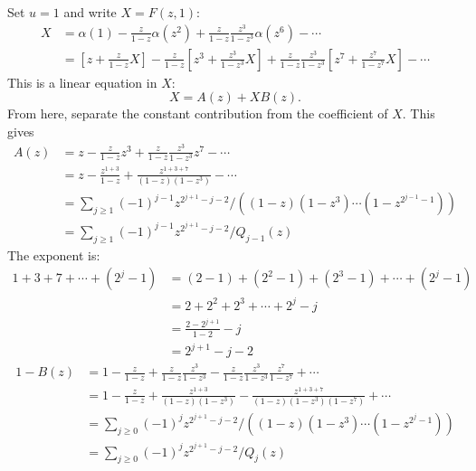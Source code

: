 Set $u = 1$ and write $X = F(z, 1)$:
\begin{equation*}
    \begin{aligned}
        X
        &= \alpha(1) - \frac{z}{1 - z} \alpha(z^{2}) + \frac{z}{1 - z} \frac{z^{3}}{1 - z^{3}}\alpha(z^{6}) - \cdots \\
        &= \left[z + \frac{z}{1 - z} X\right]
            - \frac{z}{1 - z} \left[z^{3} + \frac{z^{3}}{1 - z^{3}}X\right]
            + \frac{z}{1 - z} \frac{z^{3}}{1 - z^{3}}\left[z^{7} + \frac{z^{7}}{1 - z^{7}}X\right] - \cdots
    \end{aligned}
\end{equation*}
This is a linear equation in $X$:
\begin{equation} \label{eq:III.22.6}
    X = A(z) + X B(z).
\end{equation}
From here, separate the constant contribution from the coefficient of $X$. This gives
\begin{equation*}
    \begin{aligned}
        A(z)
        &= z - \frac{z}{1 - z} z^{3} + \frac{z}{1 - z} \frac{z^{3}}{1 - z^{3}}z^{7} - \cdots \\
        &= z - \frac{z^{1 + 3}}{1 - z} + \frac{z^{1 + 3 + 7}}{(1 - z)(1 - z^{3})} - \cdots \\
        &= \sum_{j \geq 1}(-1)^{j - 1}z^{2^{j + 1} - j - 2}/\left((1 - z)(1 - z^{3}) \cdots (1 - z^{2^{j - 1} - 1})\right) \\
        &= \sum_{j \geq 1}(-1)^{j - 1}z^{2^{j + 1} - j - 2}/Q_{j - 1}(z)
    \end{aligned}
\end{equation*}
The exponent is:
\begin{equation*}
    \begin{aligned}
        1 + 3 + 7 + \cdots + (2^{j} - 1)
        &= (2 - 1) + (2^{2} - 1) + (2^{3} - 1) + \cdots + (2^{j} - 1) \\
        &= 2 + 2^{2} + 2^{3} + \cdots + 2^{j} - j \\
        &= \frac{2 - 2^{j + 1}}{1 - 2} - j \\
        &= 2^{j + 1} - j - 2
    \end{aligned}
\end{equation*}
\begin{equation*}
    \begin{aligned}
        1 - B(z)
        &= 1 - \frac{z}{1 - z} + \frac{z}{1 - z} \frac{z^{3}}{1 - z^{3}} - \frac{z}{1 - z} \frac{z^{3}}{1 - z^{3}} \frac{z^{7}}{1 - z^{7}} + \cdots \\
        &= 1 - \frac{z}{1 - z} + \frac{z^{1 + 3}}{(1 - z)(1 - z^{3})} - \frac{z^{1 + 3 + 7}}{(1 - z)(1 - z^{3})(1 - z^{7})} + \cdots \\
        &= \sum_{j \geq 0}(-1)^{j}z^{2^{j + 1} - j - 2}/\left((1 - z)(1 - z^{3}) \cdots (1 - z^{2^{j} - 1})\right) \\
        &= \sum_{j \geq 0}(-1)^{j}z^{2^{j + 1} - j - 2}/Q_{j}(z)
    \end{aligned}
\end{equation*}
